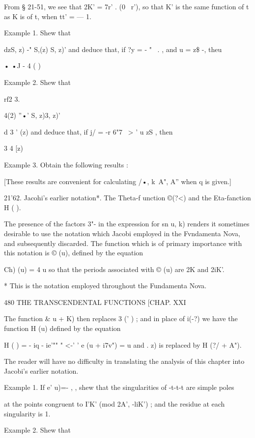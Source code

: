 From § 21-51, we see that 2K' = 7r' . (0 \ r'), so that K' is the same 
function of t as K is of t, when tt' = — 1. 

Example 1. Shew that 

dzS, z) -"  S,(z) S, z)' 
and deduce that, if ?y = -   " ~. , and u = z\$ -, theu 

• •J - 4 ( ) 

Example 2. Shew that 

rf2 3. 



4(2) ''•' S, z)3, z)' 



d 3 ' (z) 
and deduce that, if j/ = -r  6"7 \ >  '  u zS , then 

 3  4 [z) 

Example 3. Obtain the following results : 

[These results are convenient for calculating /•, k\ A", A'' when q is given.] 

21'62. Jacohi's earlier notation*. The Theta-f unction ©(?<) and the 
Eta-fanction H ( ). 

The presence of the factors  3"- in the expression for sn  u, k) renders it 
sometimes desirable to use the notation which Jacobi employed in the 
Fvndamenta Nova, and subsequently discarded. The function which is of 
primary importance with this notation is © (u), defined by the equation 

Ch) (u) =  4  u%
so that the periods associated with © (u) are 2K and 2iK'. 

* This is the notation employed throughout the Fundamenta Nova. 



480 THE TRANSCENDENTAL FUNCTIONS [CHAP. XXI 

The function \& u + K) then replaces  3 (' ) ; and in place of  i(-?) we 
have the function H (u) defined by the equation 

H ( ) = - iq - ie'"" " <-' '  e (u + i7v") =    u%
and  .  z) is replaced by H (?/ + A"). 

The reader will have no difficulty in translating the analysis of this 
chapter into Jacobi's earlier notation. 

Example 1. If e'  u)=- , , shew that the singularities of -t-t-t are simple poles 

at the points congruent to I'K' (mod 2A', -liK') ; and the residue at each singularity is 1. 

Example 2. Shew that 

